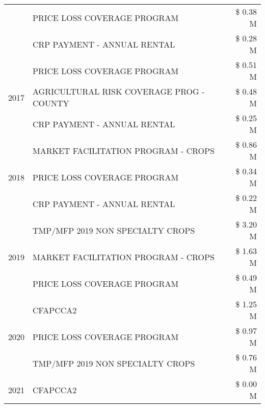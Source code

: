 \begin{tabular}{llr}
 & PRICE LOSS COVERAGE PROGRAM & \$ 0.38 M \\
 & CRP PAYMENT - ANNUAL RENTAL & \$ 0.28 M \\
\cline{1-3}
\multirow[t]{3}{*}{2017} & PRICE LOSS COVERAGE PROGRAM & \$ 0.51 M \\
 & AGRICULTURAL RISK COVERAGE PROG - COUNTY & \$ 0.48 M \\
 & CRP PAYMENT - ANNUAL RENTAL & \$ 0.25 M \\
\cline{1-3}
\multirow[t]{3}{*}{2018} & MARKET FACILITATION PROGRAM - CROPS & \$ 0.86 M \\
 & PRICE LOSS COVERAGE PROGRAM & \$ 0.34 M \\
 & CRP PAYMENT - ANNUAL RENTAL & \$ 0.22 M \\
\cline{1-3}
\multirow[t]{3}{*}{2019} & TMP/MFP 2019 NON SPECIALTY CROPS & \$ 3.20 M \\
 & MARKET FACILITATION PROGRAM - CROPS & \$ 1.63 M \\
 & PRICE LOSS COVERAGE PROGRAM & \$ 0.49 M \\
\cline{1-3}
\multirow[t]{3}{*}{2020} & CFAPCCA2 & \$ 1.25 M \\
 & PRICE LOSS COVERAGE PROGRAM & \$ 0.97 M \\
 & TMP/MFP 2019 NON SPECIALTY CROPS & \$ 0.76 M \\
\cline{1-3}
2021 & CFAPCCA2 & \$ 0.00 M \\
\cline{1-3}
\bottomrule
\end{tabular}
